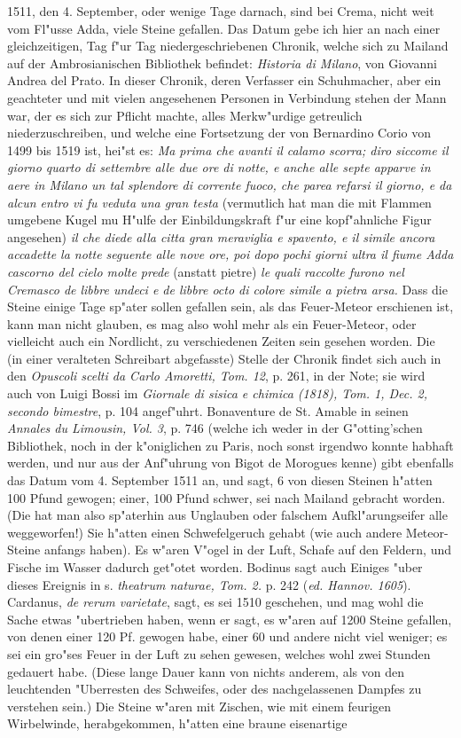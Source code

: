 \documentclass[a4paper, 11pt, oneside, polutonikogreek, german]{article}
\begin{document}
1511, den 4. September, oder wenige Tage darnach, sind bei Crema, nicht weit vom Fl"usse Adda, viele Steine gefallen. Das Datum gebe ich hier an nach einer gleichzeitigen, Tag f"ur Tag niedergeschriebenen Chronik, welche sich zu Mailand auf der Ambrosianischen Bibliothek befindet: \emph{Historia di Milano}, von Giovanni Andrea del Prato. In dieser Chronik, deren Verfasser ein Schuhmacher, aber ein geachteter und mit vielen angesehenen Personen in Verbindung stehen der Mann war, der es sich zur Pflicht machte, alles Merkw"urdige getreulich niederzuschreiben, und welche eine Fortsetzung der von Bernardino Corio von 1499 bis 1519 ist, hei"st es: \emph{Ma prima che avanti il calamo scorra; diro siccome il giorno quarto di settembre alle due ore di notte, e anche alle septe apparve in aere in Milano un tal splendore di corrente fuoco, che parea refarsi il giorno, e da alcun entro vi fu veduta una gran testa} (vermutlich hat man die mit Flammen umgebene Kugel mu H"ulfe der Einbildungskraft f"ur eine kopf"ahnliche Figur angesehen) \emph{il che diede alla citta gran meraviglia e spavento, e il simile ancora accadette la notte seguente alle nove ore, poi dopo pochi giorni ultra il fiume Adda cascorno del cielo molte prede} (anstatt pietre) \emph{le quali raccolte furono nel Cremasco de libbre undeci e de libbre octo di colore simile a pietra arsa.} Dass die Steine einige Tage sp"ater sollen gefallen sein, als das Feuer-Meteor erschienen ist, kann man nicht glauben, es mag also wohl mehr als ein Feuer-Meteor, oder vielleicht auch ein Nordlicht, zu verschiedenen Zeiten sein gesehen worden. Die (in einer veralteten Schreibart abgefasste) Stelle der Chronik findet sich auch in den \emph{Opuscoli scelti da Carlo Amoretti, Tom. 12}, p. 261, in der Note; sie wird auch von Luigi Bossi im \emph{Giornale di sisica e chimica (1818), Tom. 1, Dec. 2, secondo bimestre}, p. 104 angef"uhrt. Bonaventure de St. Amable in seinen \emph{Annales du Limousin, Vol. 3}, p. 746 (welche ich weder in der G"otting'schen Bibliothek, noch in der k"oniglichen zu Paris, noch sonst irgendwo konnte habhaft werden, und nur aus der Anf"uhrung von Bigot de Morogues kenne) gibt ebenfalls das Datum vom 4. September 1511 an, und sagt, 6 von diesen Steinen h"atten 100 Pfund gewogen; einer, 100 Pfund schwer, sei nach Mailand gebracht worden. (Die hat man also sp"aterhin aus Unglauben oder falschem Aufkl"arungseifer alle weggeworfen!) Sie h"atten einen Schwefelgeruch gehabt (wie auch andere Meteor-Steine anfangs haben). Es w"aren V"ogel in der Luft, Schafe auf den Feldern, und Fische im Wasser dadurch get"otet worden. Bodinus sagt auch Einiges "uber dieses Ereignis in s. \emph{theatrum naturae, Tom. 2.} p. 242 (\emph{ed. Hannov. 1605}). Cardanus, \emph{de rerum varietate}, sagt, es sei 1510 geschehen, und mag wohl die Sache etwas "ubertrieben haben, wenn er sagt, es w"aren auf 1200 Steine gefallen, von denen einer 120 Pf. gewogen habe, einer 60 und andere nicht viel weniger; es sei ein gro"ses Feuer in der Luft zu sehen gewesen, welches wohl zwei Stunden gedauert habe. (Diese lange Dauer kann von nichts anderem, als von den leuchtenden "Uberresten des Schweifes, oder des nachgelassenen Dampfes zu verstehen sein.) Die Steine w"aren mit Zischen, wie mit einem feurigen Wirbelwinde, herabgekommen, h"atten eine braune eisenartige 
\end{document}
